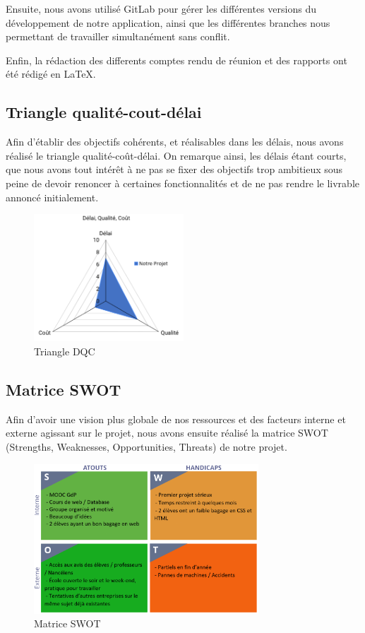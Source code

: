 \documentclass[french,a4paper]{article}
\begin{document}
Ensuite, nous avons utilisé GitLab pour gérer les différentes versions du développement de notre application, ainsi que les différentes branches nous permettant de travailler simultanément sans conflit.

Enfin, la rédaction des differents comptes rendu de réunion et des rapports ont été rédigé en \LaTeX.

\subsection{Triangle qualité-cout-délai}
Afin d’établir des objectifs cohérents, et réalisables dans les délais, nous avons réalisé le triangle qualité-coût-délai. On remarque ainsi, les délais étant courts, que nous avons tout intérêt à ne pas se fixer des objectifs trop ambitieux sous peine de devoir renoncer à certaines fonctionnalités et de ne pas rendre le livrable annoncé initialement.

\begin{figure}[H]
    \centering
    \includegraphics[width=0.5\textwidth]{img/triangle_QCD.png}
    \caption{Triangle DQC}
\end{figure} 

\subsection{Matrice SWOT}
Afin d’avoir une vision plus globale de nos ressources et des facteurs interne et externe agissant sur le projet, nous avons ensuite réalisé la matrice SWOT (Strengths, Weaknesses, Opportunities, Threats) de notre projet.

\begin{figure}[H]
    \centering
    \includegraphics[width=0.75\textwidth]{img/SWOT.png}
    \caption{Matrice SWOT}
\end{figure} 
\end{document}
